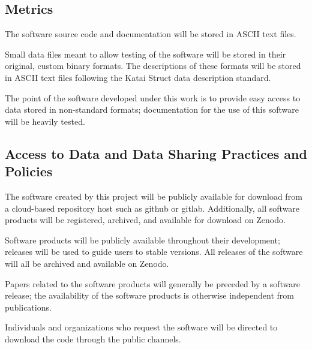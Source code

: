 \documentclass[11pt,oneside]{memoir}
\begin{document}
\subsection{Metrics}
The software source code and documentation will be stored in ASCII text files.  

Small data files meant to allow testing of the software will be stored in their original, custom binary formats.  The descriptions of these formats will be stored in ASCII text files following the Katai Struct data description standard.

The point of the software developed under this work is to provide easy access to data stored in non-standard formats; documentation for the use of this software will be heavily tested.


\subsection{Access to Data and Data Sharing Practices and Policies}
The software created by this project will be publicly available for download from a cloud-based repository host such as github or gitlab.  Additionally, all software products will be registered, archived, and available for download on Zenodo.

Software products will be publicly available throughout their development; releases will be used to guide users to stable versions.  All releases of the software will all be archived and available on Zenodo.

Papers related to the software products will generally be preceded by a software release; the availability of the software products is otherwise independent from publications.

Individuals and organizations who request the software will be directed to download the code through the public channels.

\end{document}

